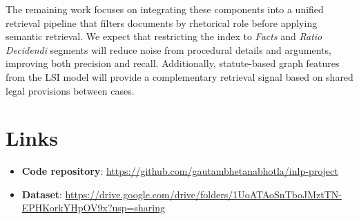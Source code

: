 \documentclass[11pt]{article}
\begin{document}
The remaining work focuses on integrating these components into a unified retrieval pipeline that filters documents by rhetorical role before applying semantic retrieval.
We expect that restricting the index to \emph{Facts} and \emph{Ratio Decidendi} segments will reduce noise from procedural details and arguments, improving both precision and recall.
Additionally, statute-based graph features from the LSI model will provide a complementary retrieval signal based on shared legal provisions between cases.

\section{Links}
\begin{itemize}
    \item \textbf{Code repository}: \url{https://github.com/gautambhetanabhotla/inlp-project}
    \item \textbf{Dataset}: \url{https://drive.google.com/drive/folders/1UoATAoSnTboJMztTN-EPHKorkYHpOV9x?usp=sharing}
\end{itemize}


\end{document}
